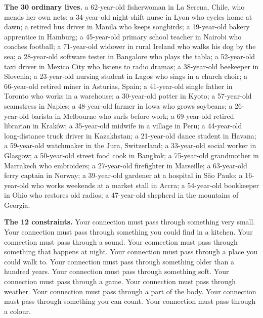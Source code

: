 \noindent\textbf{The 30 ordinary lives.} \small a 62-year-old fisherwoman in La Serena, Chile, who mends her own nets; a 34-year-old night-shift nurse in Lyon who cycles home at dawn; a retired bus driver in Manila who keeps songbirds; a 19-year-old bakery apprentice in Hamburg; a 45-year-old primary school teacher in Nairobi who coaches football; a 71-year-old widower in rural Ireland who walks his dog by the sea; a 28-year-old software tester in Bangalore who plays the tabla; a 52-year-old taxi driver in Mexico City who listens to radio dramas; a 38-year-old beekeeper in Slovenia; a 23-year-old nursing student in Lagos who sings in a church choir; a 66-year-old retired miner in Asturias, Spain; a 41-year-old single father in Toronto who works in a warehouse; a 30-year-old potter in Kyoto; a 57-year-old seamstress in Naples; a 48-year-old farmer in Iowa who grows soybeans; a 26-year-old barista in Melbourne who surfs before work; a 69-year-old retired librarian in Kraków; a 35-year-old midwife in a village in Peru; a 44-year-old long-distance truck driver in Kazakhstan; a 21-year-old dance student in Havana; a 59-year-old watchmaker in the Jura, Switzerland; a 33-year-old social worker in Glasgow; a 50-year-old street food cook in Bangkok; a 75-year-old grandmother in Marrakech who embroiders; a 27-year-old firefighter in Marseille; a 63-year-old ferry captain in Norway; a 39-year-old gardener at a hospital in São Paulo; a 16-year-old who works weekends at a market stall in Accra; a 54-year-old bookkeeper in Ohio who restores old radios; a 47-year-old shepherd in the mountains of Georgia.

\noindent\textbf{The 12 constraints.} \small Your connection must pass through something very small. Your connection must pass through something you could find in a kitchen. Your connection must pass through a sound. Your connection must pass through something that happens at night. Your connection must pass through a place you could walk to. Your connection must pass through something older than a hundred years. Your connection must pass through something soft. Your connection must pass through a game. Your connection must pass through weather. Your connection must pass through a part of the body. Your connection must pass through something you can count. Your connection must pass through a colour.
